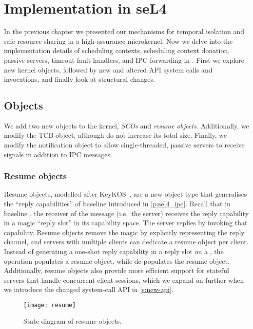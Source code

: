 \chapter{Implementation in seL4}
\label{chap:implementation}

In the previous chapter we presented our mechanisms for temporal isolation and safe resource sharing
in a high-assurance microkernel. 
Now we delve into the implementation details of scheduling contexts, scheduling context donation,
passive servers, timeout fault handlers, and IPC forwarding in \selfour. First we explore new kernel
objects, followed by new and altered API system calls and invocations, and finally look at structural changes.

\section{Objects}

We add two new objects to the kernel, \emph{\glspl{SCO}} and \emph{resume objects}. Additionally, we modify
the \gls{TCB} object, although do not increase its total size. Finally, we modify the notification
object to allow single-threaded, passive servers to receive signals in
addition to IPC messages.

\subsection{Resume objects}
\label{s:resume}

Resume objects, modelled after KeyKOS~\citep{Bomberger_FFHLS_92}, are a new object type that
generalises the ``reply capabilities'' of baseline \selfour introduced in \cref{p:sel4_ipc}.  Recall that in
baseline \selfour, the receiver of the message (i.e.\ the server) receives the reply capability in a
magic ``reply slot'' in its capability space. The server replies by invoking that capability. Resume
objects remove the magic by explicitly representing the reply channel, and servers with multiple
clients can dedicate a resume object per client.  Instead of generating a one-shot reply capability
in a reply slot on a \call, the operation populates a resume object, while \recv de-populates the
resume object.  Additionally, resume objects also provide more efficient support for stateful servers that handle concurrent
client sessions, which we expand on further when we introduce the changed system-call \gls{API} in
\cref{s:new-api}.

\begin{figure}[t]
    \centering
    \texttt{[image: resume]}
    \caption{State diagram of resume objects.}
    \label{f:resume-state-diagram}
\end{figure}

